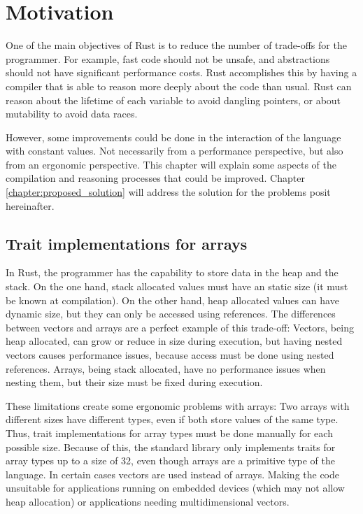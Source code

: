 \chapter{Motivation}
One of the main objectives of Rust is to reduce the number of trade-offs for the programmer. For example, fast code should not be unsafe, and abstractions should not have significant performance costs. Rust accomplishes this by having a compiler that is able to reason more deeply about the code than usual. Rust can reason about the lifetime of each variable to avoid dangling pointers, or about mutability to avoid data races. 

However, some improvements could be done in the interaction of the language with constant values. Not necessarily from a performance perspective, but also from an ergonomic perspective. This chapter will explain some aspects of the compilation and reasoning processes that could be improved. Chapter \ref{chapter:proposed_solution} will address the solution for the problems posit hereinafter.

\label{chapter:motivation}
\section{Trait implementations for arrays}
In Rust, the programmer has the capability to store data in the heap and the stack. On the one hand, stack allocated values must have an static size (it must be known at compilation). On the other hand, heap allocated values can have dynamic size, but they can only be accessed using references. The differences between vectors and arrays are a perfect example of this trade-off: Vectors, being heap allocated, can grow or reduce in size during execution, but having nested vectors causes performance issues, because access must be done using nested references. Arrays, being stack allocated, have no performance issues when nesting them, but their size must be fixed during execution.

These limitations create some ergonomic problems with arrays: Two arrays with different sizes have different types, even if both store values of the same type. Thus, trait implementations for array types must be done manually for each possible size. Because of this, the standard library only implements traits for array types up to a size of 32, even though arrays are a primitive type of the language. In certain cases vectors are used instead of arrays. Making the code unsuitable for applications running on embedded devices (which may not allow heap allocation) or applications needing multidimensional vectors.

